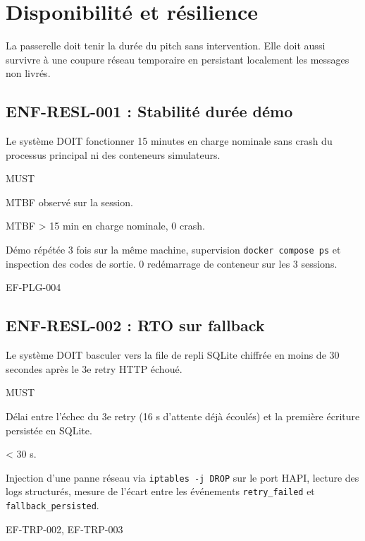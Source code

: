 \section{Disponibilité et résilience}
\label{sec:enf-resilience}

La passerelle doit tenir la durée du pitch sans intervention. Elle doit aussi survivre à une coupure réseau temporaire en persistant localement les messages non livrés.

\subsection*{ENF-RESL-001 : Stabilité durée démo}
\begin{description}[leftmargin=2.5cm, style=nextline]
  \item[Énoncé] Le système DOIT fonctionner 15 minutes en charge nominale sans crash du processus principal ni des conteneurs simulateurs.
  \item[Priorité] MUST
  \item[Métrique] MTBF observé sur la session.
  \item[Cible] MTBF > 15 min en charge nominale, 0 crash.
  \item[Mesure] Démo répétée 3 fois sur la même machine, supervision \texttt{docker compose ps} et inspection des codes de sortie. 0 redémarrage de conteneur sur les 3 sessions.
  \item[Lié à] EF-PLG-004
\end{description}

\subsection*{ENF-RESL-002 : RTO sur fallback}
\begin{description}[leftmargin=2.5cm, style=nextline]
  \item[Énoncé] Le système DOIT basculer vers la file de repli SQLite chiffrée en moins de 30 secondes après le 3e retry HTTP échoué.
  \item[Priorité] MUST
  \item[Métrique] Délai entre l'échec du 3e retry (16 s d'attente déjà écoulés) et la première écriture persistée en SQLite.
  \item[Cible] < 30 s.
  \item[Mesure] Injection d'une panne réseau via \texttt{iptables -j DROP} sur le port HAPI, lecture des logs structurés, mesure de l'écart entre les événements \texttt{retry\_failed} et \texttt{fallback\_persisted}.
  \item[Lié à] EF-TRP-002, EF-TRP-003
\end{description}

